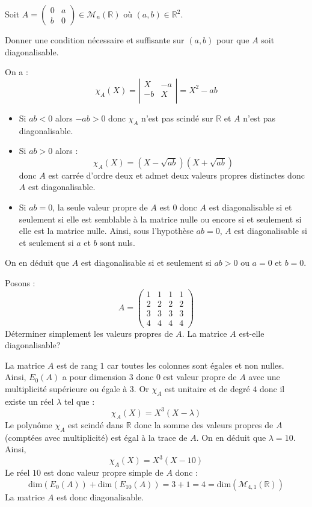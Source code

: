 \documentclass[a4paper,10pt]{report}
\begin{document}
\begin{Exa} Soit $A= \begin{pmatrix}
0 & a \\
b & 0
\end{pmatrix} \in \mathcal{M}_n(\mathbb{R})$ où $(a,b) \in \mathbb{R}^2$. 

Donner une condition nécessaire et suffisante sur $(a,b)$ pour que $A$ soit diagonalisable.
\end{Exa}

\corr On a :
$$ \chi_A(X) = \left\vert \begin{array}{cc}
X & -a \\
-b & X \\
\end{array}\right\vert = X^2-ab$$
\begin{itemize}
\item Si $ab<0$ alors $-ab>0$ donc $\chi_A$ n'est pas scindé sur $\mathbb{R}$ et $A$ n'est pas diagonalisable.
\item Si $ab>0$ alors :
$$ \chi_A(X) = (X- \sqrt{ab}) (X+ \sqrt{ab})$$
donc $A$ est carrée d'ordre deux et admet deux valeurs propres distinctes donc $A$ est diagonalisable.
\item Si $ab=0$, la seule valeur propre de $A$ est $0$ donc $A$ est diagonalisable si et seulement si elle est semblable à la matrice nulle ou encore si et seulement si elle est la matrice nulle. Ainsi, sous l'hypothèse $ab=0$, $A$ est diagonalisable si et seulement si $a$ et $b$ sont nuls.
\end{itemize}
On en déduit que $A$ est diagonalisable si et seulement si $ab>0$ ou $a=0$ et $b=0$.


\begin{Exa} Posons :
    \[
    A =
    \begin{pmatrix}
      1 & 1 & 1 & 1 \\
      2 & 2 & 2 & 2 \\
      3 & 3 & 3 & 3 \\
      4 & 4 & 4 & 4
    \end{pmatrix}
    \]
Déterminer simplement les valeurs propres de $A$. La matrice $A$ est-elle diagonalisable?
\end{Exa}

\corr La matrice $A$ est de rang $1$ car toutes les colonnes sont égales et non nulles. Ainsi, $E_0(A)$ a pour dimension $3$ donc $0$ est valeur propre de $A$ avec une multiplicité supérieure ou égale à $3$. Or $\chi_A$ est unitaire et de degré $4$ donc il existe un réel $\lambda$ tel que :
$$ \chi_A(X) = X^3(X-\lambda)$$
Le polynôme $\chi_A$ est scindé dans $\mathbb{R}$ donc la somme des valeurs propres de $A$ (comptées avec multiplicité) est égal à la trace de $A$. On en déduit que $\lambda = 10$. Ainsi,
$$ \chi_A(X)=X^3(X- 10)$$
Le réel $10$ est donc valeur propre simple de $A$ donc :
$$ \textrm{dim}(E_0(A))+ \textrm{dim}(E_{10}(A)) = 3+1 = 4 = \textrm{dim}(\mathcal{M}_{4,1}(\mathbb{R}))$$
La matrice $A$ est donc diagonalisable.
\end{document}
